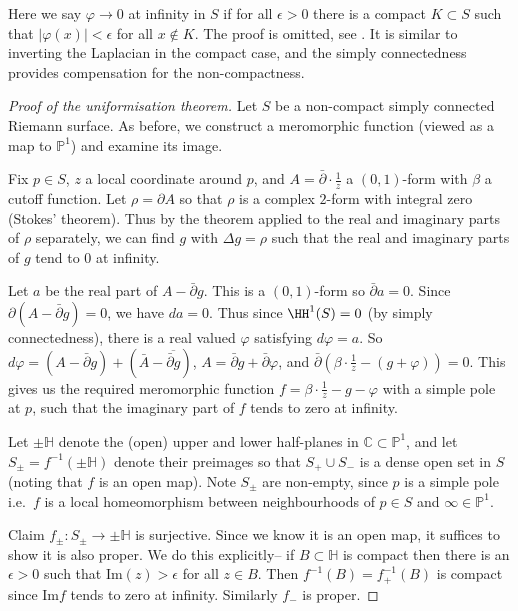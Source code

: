 Here we say \(\varphi\to 0\) at infinity in \(S\) if for all \(\epsilon > 0\)
there is a compact \(K\subset S\) such that \(|\varphi(x)|<\epsilon \) for all
\(x\notin K\). The proof is omitted, see \cite{donaldsonRiemannSurfaces}. It
is similar to inverting the Laplacian in the compact case, and the simply
connectedness provides compensation for the non-compactness.

\begin{proof}[Proof of the uniformisation theorem]
    Let \(S\) be a non-compact simply connected Riemann surface. As before, we
    construct a meromorphic function (viewed as a map to \(\mathbb{P}^1\)) and
    examine its image.

     Fix
    \(p\in S\), \(z\) a local coordinate around \(p\), and \(A=\bar\partial
    \cdot \frac{1}{z}\) a \((0,1)\)-form with \(\beta\) a cutoff function. Let
    \(\rho = \partial A\) so that \(\rho\) is a complex \(2\)-form with integral
    zero (Stokes' theorem). Thus by the theorem applied to the real and
    imaginary parts of \(\rho\) separately, we can find \(g\) with \(\Delta g =
    \rho\) such that the real and imaginary parts of \(g\) tend to \(0\) at
    infinity.

    Let \(a\) be the real part of \(A-\bar\partial g\). This is a
    \((0,1)\)-form so \(\bar\partial a=0\). Since \(\partial(A-\bar\partial
    g)=0\), we have \(da=0\). Thus since \(\HH^1(S)=0\) (by simply
    connectedness), there is a real valued \(\varphi\) satisfying
    \(d\varphi  =a\). So \(d\varphi = (A-\bar\partial g ) + (\bar A -
    \overline{\bar\partial g})\), \(A=\bar\partial g + \bar\partial
    \varphi\), and \(\bar\partial (\beta\cdot
    \frac{1}{z}-(g+\varphi))=0\). This gives us the required meromorphic
    function \(f=\beta\cdot \frac{1}{z}-g-\varphi\) with a simple pole at \(p\),
    such that the imaginary part of \(f\) tends to zero at infinity.

     Let \(\pm \mathbb{H}\) denote the
    (open) upper and lower half-planes in \(\mathbb{C}\subset \mathbb{P}^1\),
    and let \(S_\pm=f^{-1}(\pm \mathbb{H})\) denote their preimages so that
    \(S_+\cup S_-\) is a dense open set in \(S\) (noting that \(f\) is an open
    map). Note \(S_\pm\) are non-empty, since \(p\) is a simple pole
    i.e.\ \(f\) is a local homeomorphism between neighbourhoods of \(p\in S\)
    and \(\infty \in \mathbb{P}^1\).

    Claim \(f_\pm:S_{\pm}\to \pm \mathbb{H}\) is surjective. Since we know it
    is an open map, it suffices to show it is also proper. We do this
    explicitly-- if \(B\subset \mathbb{H}\) is compact then there is an
    \(\epsilon>0\) such that \(\text{Im}(z)>\epsilon\) for all \(z\in B\). Then
    \(f^{-1}(B)=f_+^{-1}(B)\) is compact since \(\text{Im}f\) tends to zero at
    infinity. Similarly \(f_-\) is proper.


\end{proof}
